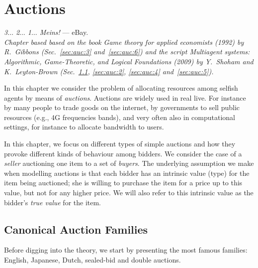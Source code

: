 \ifx \globalmark \undefined %
	
\else 	
\fi




\chapter{Auctions}
{\large{\itshape
3$\dotsc$ 2$\dotsc$ 1$\dotsc$ Meins!} --- eBay.\\
}
  {\small{\itshape
Chapter based based
on the book \emph{Game theory for applied economists} (1992) by R.\ Gibbons (Sec.~\ref{sec:auc:3} and~\ref{sec:auc:6}) and the script \emph{Multiagent systems: Algorithmic, Game-Theoretic, and Logical Foundations} (2009) by Y.\ Shoham and K.\ Leyton-Brown (Sec.~\ref{sec:auc:1}, \ref{sec:auc:2}, \ref{sec:auc:4} and~\ref{sec:auc:5}).}\\
}
\label{chap:Auct}


In this chapter we consider the problem of allocating resources among selfish agents by means of \emph{auctions}. Auctions are widely used in real live. For instance by many people to trade goods on the internet, by governments to sell public resources (e.g., 4G frequencies bands), and very often also in computational settings, for instance to allocate bandwidth to users.

In this chapter, we focus on different types of simple auctions and how they provoke different kinds of behaviour among bidders. We consider the case of a \emph{seller} auctioning one item to a set of \emph{buyers}.
The underlying assumption we make when modelling auctions is that each bidder has an intrinsic value (type) for the item being auctioned; she is willing to purchase the item for a price up to this value, but not for any higher price. We will also refer to this intrinsic value as the bidder's \emph{true value} for the item.



\section{Canonical Auction Families}
\label{sec:auc:1}
Before digging into the theory, we start by presenting the most famous families: English, Japanese, Dutch, sealed-bid and double auctions.

